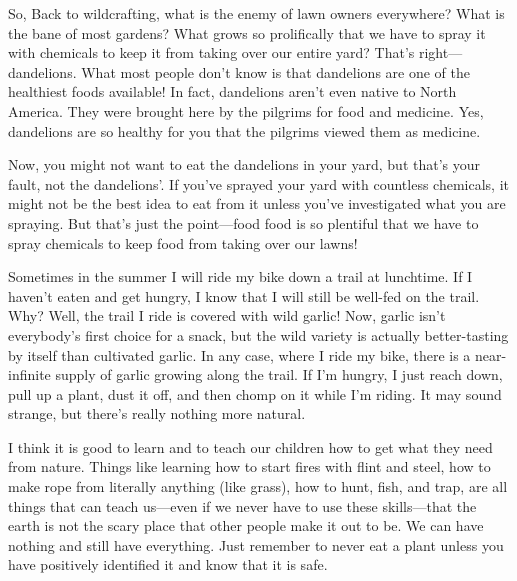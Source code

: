 So, Back to wildcrafting, what is the enemy of lawn owners everywhere? 
What is the bane of most gardens? What grows so prolifically that we
have to spray it with chemicals to keep it from taking over our entire
yard?  That’s right—dandelions. What most people don’t know is that
dandelions are one of the healthiest foods available!  In fact,
dandelions aren’t even native to North America. They were brought here
by the pilgrims for food and medicine. Yes, dandelions are so healthy
for you that the pilgrims viewed them as medicine.

Now, you might not want to eat the dandelions in your yard, but that’s
your fault, not the dandelions’. If you’ve sprayed your yard with
countless chemicals, it might not be the best idea to eat from it
unless you’ve investigated what you are spraying. But that’s just the
point—food food is so plentiful that we have to spray chemicals to keep
food from taking over our lawns!

Sometimes in the summer I will ride my bike down a trail at lunchtime.
If I haven’t eaten and get hungry, I know that I will still be well-fed
on the trail. Why?  Well, the trail I ride is covered with wild garlic!
 Now, garlic isn’t everybody’s first choice for a snack, but the wild
variety is actually better-tasting by itself than cultivated garlic. In
any case, where I ride my bike, there is a near-infinite supply of
garlic growing along the trail. If I’m hungry, I just reach down, pull
up a plant, dust it off, and then chomp on it while I’m riding. It may
sound strange, but there’s really nothing more natural.

I think it is good to learn and to teach our children how to get what
they need from nature. Things like learning how to start fires with
flint and steel, how to make rope from literally anything (like grass),
how to hunt, fish, and trap, are all things that can teach us—even if
we never have to use these skills—that the earth is not the scary place
that other people make it out to be. We can have nothing and still have
everything. Just remember to never eat a plant unless you have
positively identified it and know that it is safe.

